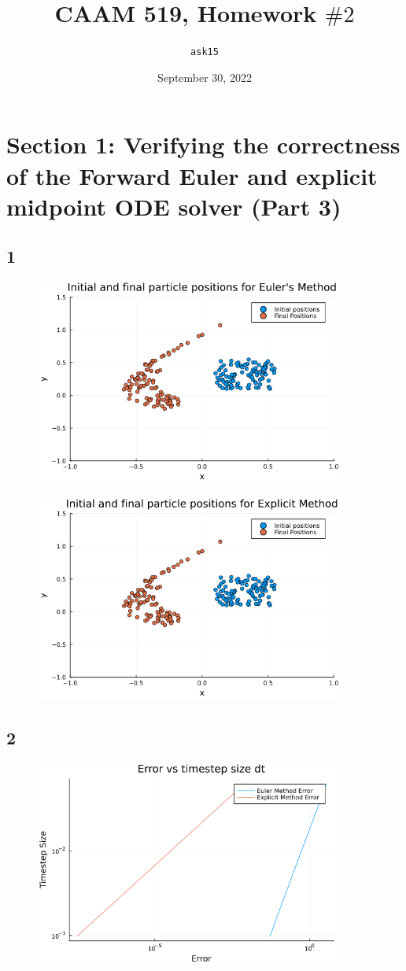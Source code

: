\documentclass{article}
\title{CAAM 519, Homework $\#2$}
\author{\texttt{ask15}}
\date{September 30, 2022}
\begin{document}
\maketitle
\section*{Section 1: Verifying the correctness of the Forward Euler and explicit midpoint ODE solver (Part 3)}
\subsection*{1}
\begin{figure}[H]
  \centering
  \includegraphics[width=4in]{plot5.png}
\end{figure}

\begin{figure}[H]
  \centering
  \includegraphics[width=4in]{plot6.png}
\end{figure}
\subsection*{2}
\begin{figure}[H]
  \centering
  \includegraphics[width=4in]{plot1.png}
\end{figure}
\end{document}
